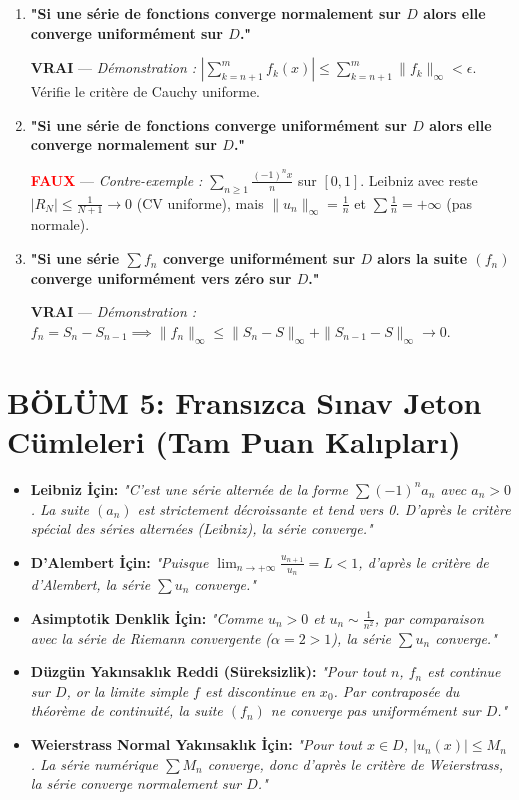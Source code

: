 \documentclass[11pt,a4paper]{article}
\begin{document}
\begin{enumerate}[leftmargin=*]
    \item \textbf{"Si une série de fonctions converge normalement sur $D$ alors elle converge uniformément sur $D$."}
    \begin{center}
    \textbf{\textcolor{blue!80!black}{VRAI}} --- \textit{Démonstration :} $|\sum_{k=n+1}^m f_k(x)| \le \sum_{k=n+1}^m \|f_k\|_\infty < \epsilon$. Vérifie le critère de Cauchy uniforme.
    \end{center}

    \item \textbf{"Si une série de fonctions converge uniformément sur $D$ alors elle converge normalement sur $D$."}
    \begin{center}
    \textbf{\textcolor{red}{FAUX}} --- \textit{Contre-exemple :} $\sum_{n \ge 1} \frac{(-1)^n x}{n}$ sur $[0, 1]$. Leibniz avec reste $|R_N| \le \frac{1}{N+1} \to 0$ (CV uniforme), mais $\|u_n\|_\infty = \frac{1}{n}$ et $\sum \frac{1}{n} = +\infty$ (pas normale).
    \end{center}

    \item \textbf{"Si une série $\sum f_n$ converge uniformément sur $D$ alors la suite $(f_n)$ converge uniformément vers zéro sur $D$."}
    \begin{center}
    \textbf{\textcolor{blue!80!black}{VRAI}} --- \textit{Démonstration :} $f_n = S_n - S_{n-1} \implies \|f_n\|_\infty \le \|S_n - S\|_\infty + \|S_{n-1} - S\|_\infty \to 0$.
    \end{center}
\end{enumerate}

\section*{BÖLÜM 5: Fransızca Sınav Jeton Cümleleri (Tam Puan Kalıpları)}

\begin{itemize}[leftmargin=*]
    \item \textbf{Leibniz İçin:} \textit{"C'est une série alternée de la forme $\sum (-1)^n a_n$ avec $a_n > 0$. La suite $(a_n)$ est strictement décroissante et tend vers 0. D'après le critère spécial des séries alternées (Leibniz), la série converge."}
    \item \textbf{D'Alembert İçin:} \textit{"Puisque $\lim_{n \to +\infty} \frac{u_{n+1}}{u_n} = L < 1$, d'après le critère de d'Alembert, la série $\sum u_n$ converge."}
    \item \textbf{Asimptotik Denklik İçin:} \textit{"Comme $u_n > 0$ et $u_n \sim \frac{1}{n^2}$, par comparaison avec la série de Riemann convergente ($\alpha = 2 > 1$), la série $\sum u_n$ converge."}
    \item \textbf{Düzgün Yakınsaklık Reddi (Süreksizlik):} \textit{"Pour tout $n$, $f_n$ est continue sur $D$, or la limite simple $f$ est discontinue en $x_0$. Par contraposée du théorème de continuité, la suite $(f_n)$ ne converge pas uniformément sur $D$."}
    \item \textbf{Weierstrass Normal Yakınsaklık İçin:} \textit{"Pour tout $x \in D$, $|u_n(x)| \le M_n$. La série numérique $\sum M_n$ converge, donc d'après le critère de Weierstrass, la série converge normalement sur $D$."}
\end{itemize}
\end{document}
